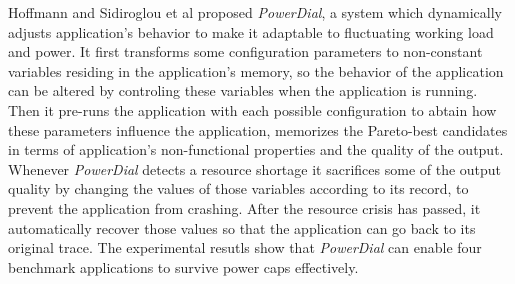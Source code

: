 Hoffmann and Sidiroglou et al\cite{Hoffmann:2011:DKR:1961296.1950390} proposed \emph{PowerDial}, a system which dynamically adjusts application's behavior to make it adaptable to fluctuating working load and power. It first transforms some configuration parameters to non-constant variables residing in the application's memory, so the behavior of the application can be altered by controling these variables when the application is running. Then it pre-runs the application with each possible configuration to abtain how these parameters influence the application, memorizes the Pareto-best candidates in terms of application's non-functional properties and the quality of the output. Whenever \emph{PowerDial} detects a resource shortage it sacrifices some of the output quality by changing the values of those variables according to its record, to prevent the application from crashing. After the resource crisis has passed, it automatically recover those values so that the application can go back to its original trace. The experimental resutls show that \emph{PowerDial} can enable four benchmark applications to survive power caps effectively.
